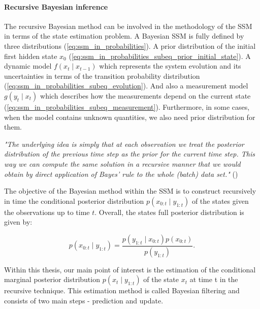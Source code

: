 \paragraph*{Recursive Bayesian inference}
The recursive Bayesian method can be involved in the
methodology of the SSM in terms of the state estimation problem. A Bayesian SSM is fully defined by three distributions (\ref{eq:ssm_in_probabilities}). A prior distribution of the initial first hidden state \(x_0\) (\ref{eq:ssm_in_probabilities_subeq_prior_initial_state}).  A dynamic model \(f(x_t \mid x_{t-1})\) which represents the system evolution and its uncertainties in terms of the transition probability distribution (\ref{eq:ssm_in_probabilities_subeq_evolution}). And also a measurement model \(g(y_t \mid x_t)\) which describes how the measurements depend on the current state (\ref{eq:ssm_in_probabilities_subeq_measurement}). Furthermore, in some cases, when the model contains unknown quantities, we also need prior distribution for them.

{\em
"The underlying idea is simply that at each
observation we treat the posterior distribution of the previous time step
as the prior for the current time step. This way we can compute the same
solution in a recursive manner that we would obtain by direct application
of Bayes’ rule to the whole (batch) data set."
}(\cite[page~31]{sarkka_bayesian_2013})

The objective of the Bayesian method within the SSM is to construct
recursively in time the conditional posterior distribution \(p(x_{0:t} \mid y_{1:t})\) of the states given the observations up to time \(t\). Overall, the states full posterior distribution is given by:

\begin{equation}
p(x_{0:t} \mid y_{1:t}) = \frac{p(y_{1:t} \mid x_{0:t})p(x_{0:t})}{p(y_{1:t})}.
\label{eq:states_full_posterior_distribution}
\end{equation}

Within this thesis, our main point of interest is the estimation of the conditional marginal posterior distribution \(p(x_t \mid y_{1:t})\) of the state \(x_t\) at time t in the recursive technique. This estimation method is called Bayesian filtering and consists of two main steps - prediction and update.

